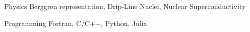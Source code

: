 

\begin{cvskills}

  \cvskill
    {Physics} %
    {Berggren representation, Drip-Line Nuclei, Nuclear Superconductivity} %

  \cvskill
    {Programming} %
    {Fortran, C/C++, Python, Julia} %


\end{cvskills}

